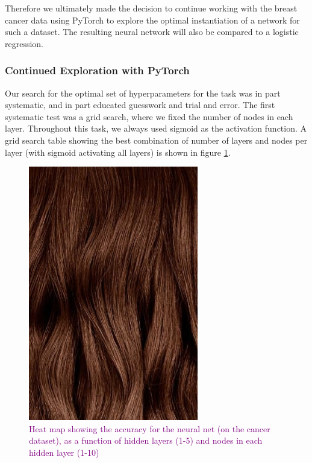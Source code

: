 Therefore we ultimately made the decision to continue working with the breast cancer data using PyTorch to explore the optimal instantiation of a network for such a dataset. The resulting neural network will also be compared to a logistic regression. 

\subsubsection{Continued Exploration with PyTorch}
Our search for the optimal set of hyperparameters for the task was in part systematic, and in part educated guesswork and trial and error. The first systematic test was a grid search, where we fixed the number of nodes in each layer. Throughout this task, we always used sigmoid as the activation function. A grid search table showing the best combination of number of layers and nodes per layer (with sigmoid activating all layers) is shown in figure \ref{fig:gridsearch_layers_nodes}. 


\begin{figure}
    \centering
    \includegraphics[width=0.5\linewidth]{figures/placeholders/gridsearch_layers_nodes.png}
    \caption{\textcolor{purple}{Heat map showing the accuracy for the neural net (on the cancer dataset), as a function of hidden layers (1-5) and nodes in each hidden layer (1-10)}}
    \label{fig:gridsearch_layers_nodes}
\end{figure}

